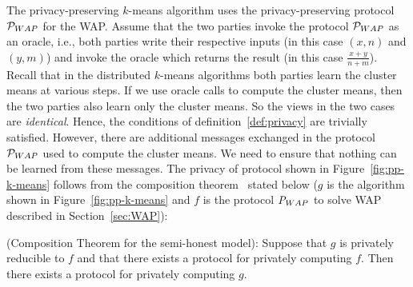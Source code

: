 The privacy-preserving $k$-means algorithm uses the privacy-preserving
protocol ${\cal P}_{WAP}$ for the WAP. Assume that the two parties
invoke the protocol ${\cal P}_{WAP}$ as an oracle, i.e., both parties
write their respective inputs (in this case $(x,n)$ and $(y,m)$) and
invoke the oracle which returns the result (in this case
$\frac{x+y}{n+m}$). Recall that in the distributed $k$-means
algorithms both parties learn the cluster means at various steps. If
we use oracle calls to compute the cluster means, then the two parties
also learn only the cluster means. So the views in the two cases are
{\it identical}.  Hence, the conditions of
definition~\ref{def:privacy} are trivially satisfied. However, there
are additional messages exchanged in the protocol ${\cal P}_{WAP}$
used to compute the cluster means. We need to ensure that nothing can
be learned from these messages. The privacy of protocol shown in
Figure~\ref{fig:pp-k-means} follows from the composition
theorem~\cite{CanettiComposition} stated below ($g$ is the algorithm
shown in Figure~\ref{fig:pp-k-means} and $f$ is the protocol ${\it
P}_{WAP}$ to solve WAP described in Section~\ref{sec:WAP}):

\begin{theorem}
\label{thm:composition}
{\rm (Composition Theorem for the semi-honest model):}
Suppose that $g$ is privately reducible to $f$ and that there exists a protocol
for privately computing $f$. Then there exists a protocol for privately
computing $g$.
\end{theorem}



